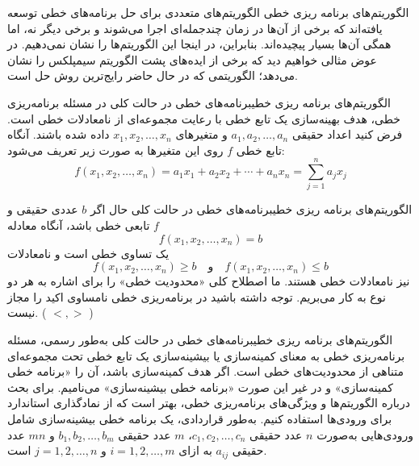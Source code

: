 \begin{itemframe}{الگوریتم‌های برنامه ریزی خطی}
\itm
الگوریتم‌های متعددی برای حل برنامه‌های خطی توسعه یافته‌اند که برخی از آن‌ها در زمان چندجمله‌ای اجرا می‌شوند و برخی دیگر نه، اما همگی آن‌ها بسیار پیچیده‌اند.
\itm
بنابراین، در اینجا این الگوریتم‌ها را نشان نمی‌دهیم. در عوض مثالی خواهیم دید که برخی از ایده‌های پشت الگوریتم سیمپلکس
را نشان می‌دهد؛ الگوریتمی که در حال حاضر رایج‌ترین روش حل است.

\end{itemframe}


\begin{itemframe-s}{الگوریتم‌های برنامه ریزی خطی}{برنامه‌های خطی در حالت کلی}
\itm
در مسئله برنامه‌ریزی خطی، هدف بهینه‌سازی یک تابع خطی با رعایت مجموعه‌ای از نامعادلات خطی است.
\itm
فرض کنید اعداد حقیقی
$a_1, a_2, \dots, a_n$
 و متغیرهای
$x_1, x_2, \dots, x_n$
داده شده باشند. آنگاه تابع خطی
 $f$
روی این متغیرها به صورت زیر تعریف می‌شود:
$$
f(x_1, x_2, \dots, x_n) = a_1 x_1 + a_2 x_2 + \cdots + a_n x_n = \sum_{j=1}^{n} a_j x_j
$$
\end{itemframe-s}


\begin{itemframe-s}{الگوریتم‌های برنامه ریزی خطی}{برنامه‌های خطی در حالت کلی}
\itm
حال اگر $b$ عددی حقیقی و $f$ تابعی خطی باشد، آنگاه معادله
$$
f(x_1, x_2, \dots, x_n) = b
$$
یک تساوی خطی است و نامعادلات
$$
f(x_1, x_2, \dots, x_n) \ge b \quad \text{و} \quad f(x_1, x_2, \dots, x_n) \le b
$$
نیز نامعادلات خطی هستند. ما اصطلاح کلی «محدودیت خطی»
را برای اشاره به هر دو نوع به کار می‌بریم.
\itm
توجه داشته باشید در برنامه‌ریزی خطی نامساوی اکید
را مجاز نیست. (
$<, >$
)
\end{itemframe-s}


\begin{itemframe-s}{الگوریتم‌های برنامه ریزی خطی}{برنامه‌های خطی در حالت کلی}
\itm
به‌طور رسمی، مسئله برنامه‌ریزی خطی به معنای کمینه‌سازی یا بیشینه‌سازی یک تابع خطی تحت مجموعه‌ای متناهی از محدودیت‌های خطی است. اگر هدف کمینه‌سازی باشد، آن را «برنامه خطی کمینه‌سازی»
و در غیر این صورت «برنامه خطی بیشینه‌سازی»
می‌نامیم.
\itm
برای بحث درباره الگوریتم‌ها و ویژگی‌های برنامه‌ریزی خطی، بهتر است که از نمادگذاری استاندارد برای ورودی‌ها استفاده کنیم.
\itm
به‌طور قراردادی، یک برنامه خطی بیشینه‌سازی شامل ورودی‌هایی به‌صورت $n$ عدد حقیقی
$c_1, c_2, \dots, c_n$،
$m$
عدد حقیقی
$b_1, b_2, \dots, b_m$
و
$mn$
عدد حقیقی
$a_{ij}$
به ازای
$i = 1, 2, \dots, m$
و
$j = 1, 2, \dots, n$
است.
\end{itemframe-s}


